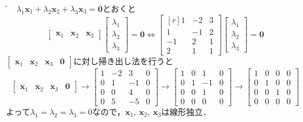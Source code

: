 \begin{tcolorbox}[breakable]
	\f{解}　$\lambda_1\bm{x}_1 + \lambda_2\bm{x}_2 + \lambda_3\bm{x}_3 =\bm{0}$とおくと
	\begin{equation*}
		\begin{bmatrix}
			\bm{x}_1 & \bm{x}_2 & \bm{x}_3
		\end{bmatrix}
		\begin{bmatrix}
			\lambda_1\\ \lambda_2\\ \lambda_3
		\end{bmatrix}
		= \bm{0} \iff 
		\begin{bmatrix*}[r]
			 1 & -2 & 3\\
			 1 & -1 & 2\\ 
			-1 &  2 & 1\\
			 2 &  1 & 1
		\end{bmatrix*}
		\begin{bmatrix}
			\lambda_1\\ \lambda_2\\ \lambda_3
		\end{bmatrix}
		= \bm{0}
	\end{equation*}
	$\begin{bmatrix}
		\bm{x}_1 & \bm{x}_2 & \bm{x}_3 & \bm{0}
	\end{bmatrix}$に対し掃き出し法を行うと
	\begin{equation*}
		\begin{bmatrix}
			\bm{x}_1 & \bm{x}_2 & \bm{x}_3 & \bm{0}
		\end{bmatrix}
		\longrightarrow
		\begin{bmatrix}
			1 & -2 &  3 & 0\\
			0 &  1 & -1 & 0\\
			0 &  0 &  4 & 0\\
			0 &  5 & -5 & 0
		\end{bmatrix}
		\longrightarrow
		\begin{bmatrix}
			1 & 0 &  1 & 0\\
			0 & 1 & -1 & 0\\
			0 & 0 &  1 & 0\\
			0 & 0 &  0 & 0
		\end{bmatrix}
		\longrightarrow
		\begin{bmatrix}
			1 & 0 & 0 & 0\\
			0 & 1 & 0 & 0\\
			0 & 0 & 1 & 0\\
			0 & 0 & 0 & 0
		\end{bmatrix}
	\end{equation*}
	よって$\lambda_1 = \lambda_2 = \lambda_3 = 0$なので，$\bm{x}_1,\ \bm{x}_2,\ \bm{x}_3$は線形独立．
\end{tcolorbox}



